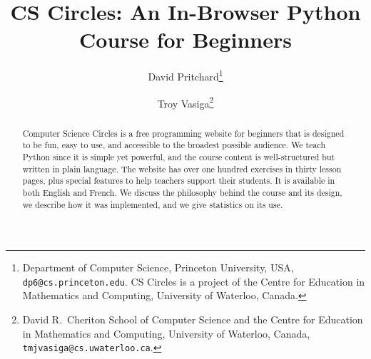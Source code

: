 \documentclass{article}
\begin{document}
\title{CS Circles: An In-Browser Python Course for Beginners}




\author{
David Pritchard\footnote{Department of Computer Science, Princeton University, USA, {\tt dp6@cs.princeton.edu}. CS Circles is a project of the Centre for Education in Mathematics and Computing, University of Waterloo, Canada.} \and
Troy Vasiga\footnote{David R.~Cheriton School of Computer Science and the Centre for Education in Mathematics and Computing, University of Waterloo, Canada, {\tt tmjvasiga@cs.uwaterloo.ca}.}}


\maketitle
\begin{abstract}
Computer Science Circles is a free programming website for beginners that is designed to be fun, easy to use, and accessible to the broadest possible audience. We teach Python since it is simple yet powerful, and the course content is well-structured but written in plain language. The website has over one hundred exercises in thirty lesson pages, plus special features to help teachers support their students. It is available in both English and French. We discuss the philosophy behind the course and its design, we describe how it was implemented, and we give statistics on its use.
\end{abstract}
\end{document}
